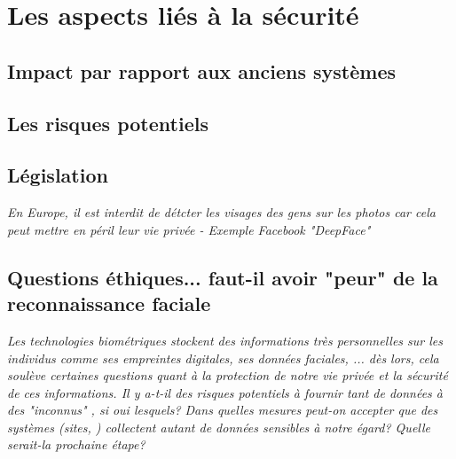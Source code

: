 \section{Les aspects liés à la sécurité}

\subsection{Impact par rapport aux anciens systèmes}
\subsection{Les risques potentiels}
\subsection{Législation}
\textit{En Europe, il est interdit de détcter les visages des gens sur les photos car cela peut mettre en péril leur vie privée - Exemple Facebook "DeepFace"}
\subsection{Questions éthiques... faut-il avoir "peur" de la reconnaissance faciale}
\textcolor{dkblue}{\textit{Les technologies biométriques stockent des informations très personnelles sur les individus comme ses empreintes digitales, ses données faciales, ... dès lors, cela soulève certaines questions quant à la protection de notre vie privée et la sécurité de ces informations. Il y a-t-il des risques potentiels à fournir tant de données à des "inconnus" , si oui lesquels? Dans quelles mesures peut-on accepter que des systèmes (sites, ) collectent autant de données sensibles à notre égard? Quelle serait-la prochaine étape?}}
